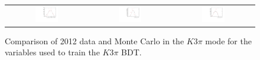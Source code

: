 \begin{figure}
\begin{tabular}{ccc}
\includegraphics[width=0.3\textwidth]{ANA_resources/Plots/Monte_carlo/data_vs_MC/Kpipipi/log10(KstarPi_IPCHI2_OWNPV)_2012.pdf} & \includegraphics[width=0.3\textwidth]{ANA_resources/Plots/Monte_carlo/data_vs_MC/Kpipipi/log10(KstarK_PT)_2012.pdf} & \includegraphics[width=0.3\textwidth]{ANA_resources/Plots/Monte_carlo/data_vs_MC/Kpipipi/log10(KstarPi_PT)_2012.pdf} \\
\end{tabular}
\caption{Comparison of 2012 data and Monte Carlo in the $K3\pi$ mode for the variables used to train the $K3\pi$ BDT.}
\label{fig:data_vs_MC_Kpipipi_2012}
\end{figure}

